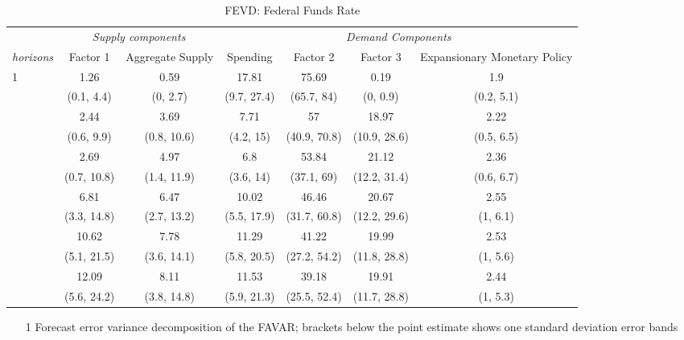 \begin{table}\caption{ FEVD: Federal Funds Rate }\begin{adjustbox}{max width=\linewidth} 
\begin{tabular}{lcccccc}
\toprule 
 & \multicolumn{2}{c}{\textit{Supply components}} & \multicolumn{4}{c}{\textit{Demand Components}} \\ 
 \cmidrule(l){2-3} \cmidrule(l){4-7} 
\textit{horizons} & Factor 1 & Aggregate Supply & Spending & Factor 2 & Factor 3 & Expansionary Monetary Policy \\ 
\midrule 
1 & 1.26 & 0.59 & 17.81 & 75.69 & 0.19 & 1.9 \\ 
  & (0.1, 4.4) & (0, 2.7) & (9.7, 27.4) & (65.7, 84) & (0, 0.9) & (0.2, 5.1) \\ 
\addlinespace 
2 & 2.44 & 3.69 & 7.71 & 57 & 18.97 & 2.22 \\ 
  & (0.6, 9.9) & (0.8, 10.6) & (4.2, 15) & (40.9, 70.8) & (10.9, 28.6) & (0.5, 6.5) \\ 
\addlinespace 
3 & 2.69 & 4.97 & 6.8 & 53.84 & 21.12 & 2.36 \\ 
  & (0.7, 10.8) & (1.4, 11.9) & (3.6, 14) & (37.1, 69) & (12.2, 31.4) & (0.6, 6.7) \\ 
\addlinespace 
6 & 6.81 & 6.47 & 10.02 & 46.46 & 20.67 & 2.55 \\ 
  & (3.3, 14.8) & (2.7, 13.2) & (5.5, 17.9) & (31.7, 60.8) & (12.2, 29.6) & (1, 6.1) \\ 
\addlinespace 
12 & 10.62 & 7.78 & 11.29 & 41.22 & 19.99 & 2.53 \\ 
  & (5.1, 21.5) & (3.6, 14.1) & (5.8, 20.5) & (27.2, 54.2) & (11.8, 28.8) & (1, 5.6) \\ 
\addlinespace 
24 & 12.09 & 8.11 & 11.53 & 39.18 & 19.91 & 2.44 \\ 
  & (5.6, 24.2) & (3.8, 14.8) & (5.9, 21.3) & (25.5, 52.4) & (11.7, 28.8) & (1, 5.3) \\ 
\bottomrule 
\end{tabular} 
\end{adjustbox}
\begin{minipage}{\textwidth} 
{\footnotesize
\begin{enumerate}
\vspace{2mm}
    \item[1] Forecast error variance decomposition of the FAVAR; brackets below the point estimate shows one standard deviation error bands
\end{enumerate}}
     \end{minipage}
\end{table}